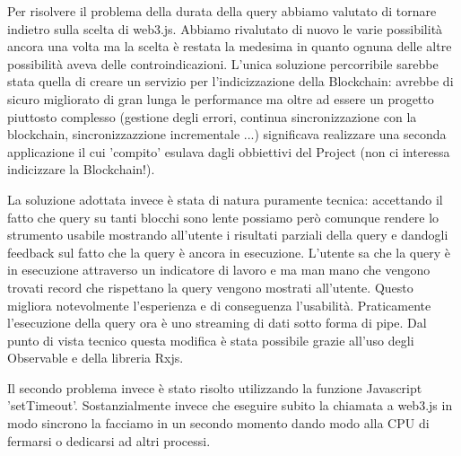 Per risolvere il problema della durata della query abbiamo valutato di tornare indietro sulla scelta di web3.js.
Abbiamo rivalutato di nuovo le varie possibilità ancora una volta ma la scelta è restata la medesima in quanto ognuna delle altre possibilità aveva delle controindicazioni.
L'unica soluzione percorribile sarebbe stata quella di creare un servizio per l'indicizzazione della Blockchain:
avrebbe di sicuro migliorato di gran lunga le performance ma oltre ad essere un progetto piuttosto complesso (gestione degli errori, continua sincronizzazione con la blockchain, sincronizzazzione incrementale ...)
significava realizzare una seconda applicazione il cui 'compito' esulava dagli obbiettivi del Project (non ci interessa indicizzare la Blockchain!).

La soluzione adottata invece è stata di natura puramente tecnica:
accettando il fatto che query su tanti blocchi sono lente possiamo però comunque rendere lo strumento usabile mostrando all'utente i risultati parziali della query e dandogli feedback sul fatto che la query è ancora in esecuzione.
L'utente sa che la query è in esecuzione attraverso un indicatore di lavoro e ma man mano che vengono trovati record che rispettano la query vengono mostrati all'utente.
Questo migliora notevolmente l'esperienza e di conseguenza l'usabilità.
Praticamente l'esecuzione della query ora è uno streaming di dati sotto forma di pipe.
Dal punto di vista tecnico questa modifica è stata possibile grazie all'uso degli Observable e della libreria Rxjs.

\vspace{0.5cm}

Il secondo problema invece è stato risolto utilizzando la funzione Javascript 'setTimeout'.
Sostanzialmente invece che eseguire subito la chiamata a web3.js in modo sincrono la facciamo in un secondo momento dando modo alla CPU di fermarsi o dedicarsi ad altri processi.
